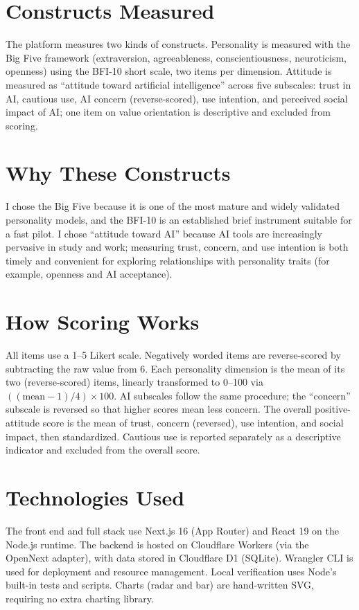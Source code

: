 \documentclass[11pt,a4paper]{article}
\begin{document}
\section{Constructs Measured}

The platform measures two kinds of constructs. Personality is measured with the Big Five framework (extraversion, agreeableness, conscientiousness, neuroticism, openness) using the BFI-10 short scale, two items per dimension. Attitude is measured as ``attitude toward artificial intelligence'' across five subscales: trust in AI, cautious use, AI concern (reverse-scored), use intention, and perceived social impact of AI; one item on value orientation is descriptive and excluded from scoring.

\section{Why These Constructs}

I chose the Big Five because it is one of the most mature and widely validated personality models, and the BFI-10 is an established brief instrument suitable for a fast pilot. I chose ``attitude toward AI'' because AI tools are increasingly pervasive in study and work; measuring trust, concern, and use intention is both timely and convenient for exploring relationships with personality traits (for example, openness and AI acceptance).

\section{How Scoring Works}

All items use a 1--5 Likert scale. Negatively worded items are reverse-scored by subtracting the raw value from 6. Each personality dimension is the mean of its two (reverse-scored) items, linearly transformed to 0--100 via $((\mathrm{mean}-1)/4)\times 100$. AI subscales follow the same procedure; the ``concern'' subscale is reversed so that higher scores mean less concern. The overall positive-attitude score is the mean of trust, concern (reversed), use intention, and social impact, then standardized. Cautious use is reported separately as a descriptive indicator and excluded from the overall score.

\section{Technologies Used}

The front end and full stack use Next.js 16 (App Router) and React 19 on the Node.js runtime. The backend is hosted on Cloudflare Workers (via the OpenNext adapter), with data stored in Cloudflare D1 (SQLite). Wrangler CLI is used for deployment and resource management. Local verification uses Node's built-in tests and scripts. Charts (radar and bar) are hand-written SVG, requiring no extra charting library.
\end{document}
